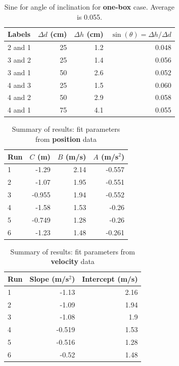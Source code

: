 \begin{table}[ht]
    \centering
    \begin{tabular}{|l|r|r|r|}
        \hline
        Labels & $\Delta d$ (cm) & $\Delta h$ (cm) & $\sin(\theta) = \Delta h / \Delta d$ \\
        \hline
        2 and 1 & 25 & 1.2 & 0.048 \\
        3 and 2 & 25 & 1.4 & 0.056 \\
        3 and 1 & 50 & 2.6 & 0.052 \\
        4 and 3 & 25 & 1.5 & 0.060 \\
        4 and 2 & 50 & 2.9 & 0.058 \\
        4 and 1 & 75 & 4.1 & 0.055 \\
        \hline
    \end{tabular}
    \caption{Sine for angle of inclination for \textbf{one-box} case. Average is 0.055.}
    \label{table:02.sine.1}
\end{table}
\begin{table}[ht]
    \centering
    \begin{tabular}{|l|r|r|r|}
        \hline
        Run & $C$ (m) & $B$ (m/s) & $A$ (m/s$^{2}$) \\
        \hline
        1 & -1.29 & 2.14 & -0.557 \\
        2 & -1.07 & 1.95 & -0.551 \\
        3 & -0.955 & 1.94 & -0.552 \\
        \hline
        4 & -1.58 & 1.53 & -0.26 \\
        5 & -0.749 & 1.28 & -0.26 \\
        6 & -1.23 & 1.48 & -0.261 \\
        \hline
    \end{tabular}
    \caption{Summary of results: fit parameters from \textbf{position} data}
    \label{table:02.fit.d}
\end{table}
\begin{table}[ht]
    \centering
    \begin{tabular}{|l|r|r|}
        \hline
        Run & Slope (m/s$^{2}$) & Intercept (m/s) \\
        \hline
        1 & -1.13 & 2.16 \\
        2 & -1.09 & 1.94 \\
        3 & -1.08 & 1.9 \\
        \hline
        4 & -0.519 & 1.53 \\
        5 & -0.516 & 1.28 \\
        6 & -0.52 & 1.48 \\
        \hline
    \end{tabular}
    \caption{Summary of results: fit parameters from \textbf{velocity} data}
    \label{table:02.fit.v}
\end{table}
